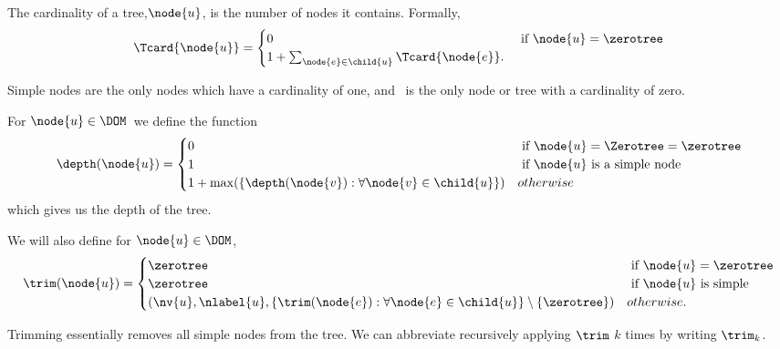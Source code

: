 \begin{definition}
  The cardinality of a tree,\(\node{u}\), is the number of nodes it contains. Formally,
  \begin{align*}
    \Tcard{\node{u}} = \begin{cases}
      0 & \text{ if } \node{u} = \zerotree\\
      1 + \sum_{\node{e}\in\child{u}} \Tcard{\node{e}}.
    \end{cases}
  \end{align*}

  Simple nodes are the only nodes which have a cardinality of one, and \tzerotree\ is the only node or tree with a
  cardinality of zero.
\end{definition}

\begin{definition}
  For $\node{u} \in \DOM$\ we define the function
  \begin{align*}
    \depth(\node{u}) = \begin{cases}
      0 & \text{ if } \node{u} = \Zerotree = \zerotree \\
      1 & \text{ if } \node{u} \text{ is a simple node} \\
      1 + \max(\lbrace\depth(\node{v}):\forall \node{v} \in \child{u}\rbrace) & otherwise
    \end{cases}
  \end{align*}
  which gives us the depth of the tree.
\end{definition}

\begin{definition}
  We will also define for $\node{u} \in \DOM$,
  \begin{align*}
    \trim(\node{u}) = \begin{cases}
      \zerotree & \text{ if } \node{u} = \zerotree \\
      \zerotree & \text{ if } \node{u} \text{ is simple} \\
      (\nv{u}, \nlabel{u}, \lbrace \trim(\node{e}): \forall\node{e}\in\child{u} \rbrace \setminus \{\zerotree\}) & otherwise.
    \end{cases}
  \end{align*}
\end{definition}

Trimming essentially removes all simple nodes from the tree.  We can
abbreviate recursively applying $\trim$ $k$ times by writing
$\trim_{k}$.

